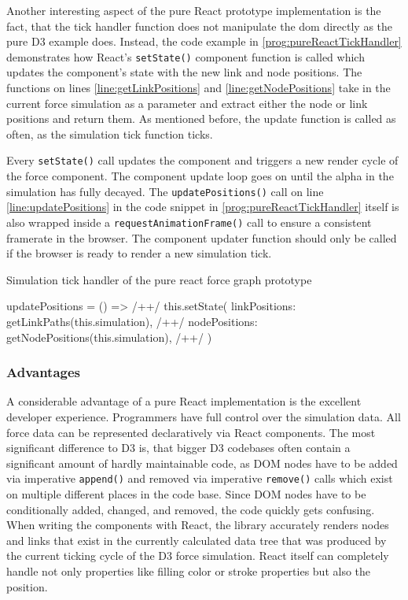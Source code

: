 Another interesting aspect of the pure React prototype implementation is the fact, that the tick handler function does not manipulate the dom directly as the pure D3 example does. Instead, the code example in \ref{prog:pureReactTickHandler} demonstrates how React's \texttt{setState()} component function is called which updates the component's state with the new link and node positions. The functions on lines \ref{line:getLinkPositions} and \ref{line:getNodePositions} take in the current force simulation as a parameter and extract either the node or link positions and return them. As mentioned before, the update function is called as often, as the simulation tick function ticks. 

Every \texttt{setState()} call updates the component and triggers a new render cycle of the force component. The component update loop goes on until the alpha in the simulation has fully decayed. The \texttt{updatePositions()} call on line \ref{line:updatePositions} in the code snippet in \ref{prog:pureReactTickHandler} itself is also wrapped inside a \texttt{requestAnimationFrame()} call to ensure a consistent framerate in the browser. The component updater function should only be called if the browser is ready to render a new simulation tick.

\begin{program}
\caption{Simulation tick handler of the pure react force graph prototype}
\label{prog:pureReactTickHandler}
\begin{JsCode}
updatePositions = () => { /+\label{line:updatePositions}+/
  this.setState({
    linkPositions: getLinkPaths(this.simulation), /+\label{line:getLinkPositions}+/
    nodePositions: getNodePositions(this.simulation), /+\label{line:getNodePositions}+/
  })
}
\end{JsCode}
\end{program}

\subsubsection{Advantages}


A considerable advantage of a pure React implementation is the excellent developer experience. Programmers have full control over the simulation data. All force data can be represented declaratively via React components. The most significant difference to D3 is, that bigger D3 codebases often contain a significant amount of hardly maintainable code, as DOM nodes have to be added via imperative \texttt{append()} and removed via imperative \texttt{remove()} calls which exist on multiple different places in the code base. Since DOM nodes have to be conditionally added, changed, and removed, the code quickly gets confusing. When writing the components with React, the library accurately renders nodes and links that exist in the currently calculated data tree that was produced by the current ticking cycle of the D3 force simulation. React itself can completely handle not only properties like filling color or stroke properties but also the position.

